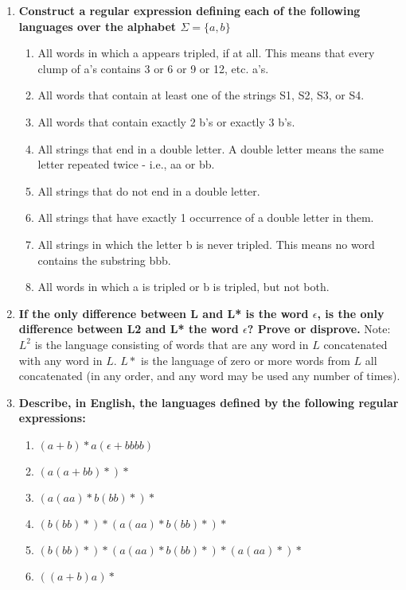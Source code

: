 
	
\begin{enumerate}
	
\item \textbf{Construct a regular expression defining each of the following languages over the alphabet $\Sigma = \{a, b\}$}

\begin{enumerate}
	\item All words in which a appears tripled, if at all. This means that every clump of a's contains 3 or 6 or 9 or 12, etc. a's.
    \item All words that contain at least one of the strings S1, S2, S3, or S4.
    \item All words that contain exactly 2 b's or exactly 3 b's.
    \item All strings that end in a double letter. A double letter means the same letter repeated twice - i.e., aa or bb.
    \item All strings that do not end in a double letter.
    \item All strings that have exactly 1 occurrence of a double letter in them.
    \item All strings in which  the letter b is never tripled. This means no word contains the substring bbb.
    \item All words in which a is tripled or b is tripled, but not both.
\end{enumerate}
		

\newpage
\item \textbf{If the only difference between L and L* is the word $\epsilon$, is the only difference between L2 and L* the word $\epsilon$? Prove or disprove.}
Note: $ L^2$ is the language consisting of words that are any word in $L$ concatenated with any word in $L$. $L*$ is the language of zero or more words from $L$ all concatenated (in any order, and any word may be used any number of times).


\newpage
\item \textbf{Describe, in English, the languages defined by the following regular expressions:}
\begin{enumerate}
  \item $(a+b)*a(\epsilon+bbbb)$
  \item $(a(a+bb)*)*$
  \item $(a(aa)*b(bb)*)*$
  \item $(b(bb)*)*(a(aa)*b(bb)*)*$
  \item $(b(bb)*)*(a(aa)*b(bb)*)*(a(aa)*)*$
  \item $((a+b)a)*$
\end{enumerate}


\end{enumerate}
